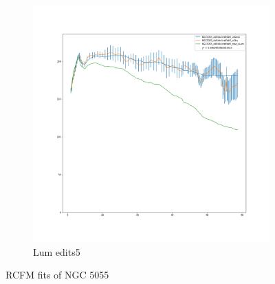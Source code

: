 \documentclass[reprint,%
 amsmath,amssymb,
 aps,
]{revtex4-1}
\begin{document}
\begin{figure}[h]
\begin{subfigure}{.5\textwidth}
  \centering
  \includegraphics[width=.8\linewidth]{NGC5055_deBlok-lcmEdit5_XueSofue}
  \caption{Lum edits5 \cite{Blok1}}
  \label{fig:sfig3}
\end{subfigure}
\caption{RCFM fits of NGC 5055 }
\label{fig:fig5055}
\end{figure}
 
 
 
\end{document}

